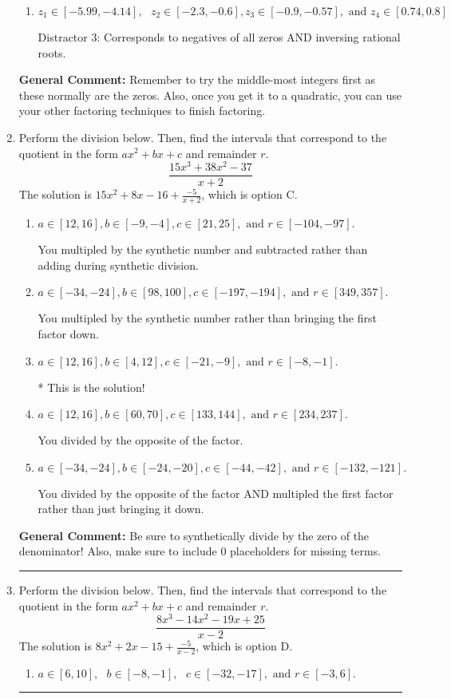\documentclass{extbook}[14pt]
\newcommand{\litem}[1]{\item #1

\rule{\textwidth}{0.4pt}}
\begin{document}
\begin{enumerate}
{\begin{enumerate}[label=\Alph*.]
 Distractor 1: Corresponds to negatives of all zeros.
\item \( z_1 \in [-5.99, -4.14], \text{   }  z_2 \in [-2.3, -0.6], z_3 \in [-0.9, -0.57], \text{   and   } z_4 \in [0.74, 0.8] \)

 Distractor 3: Corresponds to negatives of all zeros AND inversing rational roots.
\end{enumerate}

\textbf{General Comment:} Remember to try the middle-most integers first as these normally are the zeros. Also, once you get it to a quadratic, you can use your other factoring techniques to finish factoring.
}
\litem{
Perform the division below. Then, find the intervals that correspond to the quotient in the form $ax^2+bx+c$ and remainder $r$.
\[ \frac{15x^{3} +38 x^{2} -37}{x + 2} \]The solution is \( 15x^{2} +8 x -16 + \frac{-5}{x + 2} \), which is option C.\begin{enumerate}[label=\Alph*.]
\item \( a \in [12, 16], b \in [-9, -4], c \in [21, 25], \text{ and } r \in [-104, -97]. \)

 You multipled by the synthetic number and subtracted rather than adding during synthetic division.
\item \( a \in [-34, -24], b \in [98, 100], c \in [-197, -194], \text{ and } r \in [349, 357]. \)

 You multipled by the synthetic number rather than bringing the first factor down.
\item \( a \in [12, 16], b \in [4, 12], c \in [-21, -9], \text{ and } r \in [-8, -1]. \)

* This is the solution!
\item \( a \in [12, 16], b \in [60, 70], c \in [133, 144], \text{ and } r \in [234, 237]. \)

 You divided by the opposite of the factor.
\item \( a \in [-34, -24], b \in [-24, -20], c \in [-44, -42], \text{ and } r \in [-132, -121]. \)

 You divided by the opposite of the factor AND multipled the first factor rather than just bringing it down.
\end{enumerate}

\textbf{General Comment:} Be sure to synthetically divide by the zero of the denominator! Also, make sure to include 0 placeholders for missing terms.
}
\litem{
Perform the division below. Then, find the intervals that correspond to the quotient in the form $ax^2+bx+c$ and remainder $r$.
\[ \frac{8x^{3} -14 x^{2} -19 x + 25}{x -2} \]The solution is \( 8x^{2} +2 x -15 + \frac{-5}{x -2} \), which is option D.\begin{enumerate}[label=\Alph*.]
\item \( a \in [6, 10], \text{   } b \in [-8, -1], \text{   } c \in [-32, -17], \text{   and   } r \in [-3, 6]. \)


\end{enumerate}}
\end{enumerate}
\end{document}
